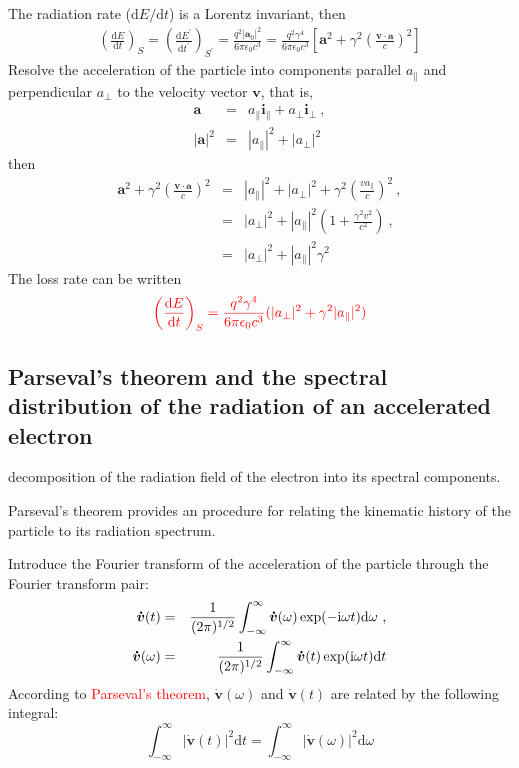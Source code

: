 \documentclass[12pt,a4paper]{article}
\renewcommand{\vec}[1]{\boldsymbol{#1}}
\newcommand{\dif}{\mathrm{d}}
\begin{document}
The radiation rate ($\dif E/\dif t$) is a Lorentz invariant, then 
\begin{eqnarray}
\left(\frac{\dif E}{\dif t}\right)_{S} = \left(\frac{\dif E^{\prime}}{\dif t^{\prime}}\right)_{S^{\prime}} = \frac{q^2 |\vec{a}_0|^2}{6\pi \epsilon_0 c^3} = \frac{q^2 \gamma^4}{6\pi \epsilon_0 c^3} \left[  \vec{a}^2 +\gamma^2 \left(\frac{\vec{v}\cdot \vec{a}}{c}\right)^2 \right]
\end{eqnarray}
Resolve the acceleration of the particle into components parallel $a_{\parallel}$ and perpendicular $a_{\perp}$ to the velocity vector $\vec{v}$, that is,
\begin{eqnarray*}
\vec{a} &=& a_{\parallel} \vec{i}_{\parallel} +a_{\perp} \vec{i}_{\perp} ~,\\
|\vec{a}|^2 &=& |a_{\parallel}|^2 +|a_{\perp}|^2
\end{eqnarray*}
then
\begin{eqnarray}
\nonumber \vec{a}^2 +\gamma^2 \left(\frac{\vec{v}\cdot \vec{a}}{c}\right)^2  &=& |a_{\parallel}|^2 +|a_{\perp}|^2 +\gamma^2\left(\frac{va_{\parallel}}{c} \right)^2 ~,\\
\nonumber &=& |a_{\perp}|^2 + |a_{\parallel}|^2 (1+\frac{\gamma^2 v^2}{c^2}) ~,\\
&=& |a_{\perp}|^2 + |a_{\parallel}|^2 \gamma^2
\end{eqnarray}
The loss rate can be written
\begin{equation}
\textcolor{red}{ \left(\frac{\dif E}{\dif t} \right)_{S} = \frac{q^2 \gamma^4}{6\pi \epsilon_0 c^3} (|a_{\perp}|^2 +\gamma^2 |a_{\parallel}|^2) }
\end{equation}

\subsection{Parseval’s theorem and the spectral distribution of the radiation of an accelerated electron}
decomposition of the radiation field of the electron into its spectral components.

Parseval’s theorem provides an procedure for relating the kinematic history of the particle to its radiation spectrum.

Introduce the Fourier transform of the acceleration of the particle through the Fourier transform pair:
\begin{eqnarray}
\vec{\dot{v}}(t) &=& \frac{1}{(2\pi)^{1/2}} \int_{-\infty}^{\infty} \vec{\dot{v}}(\omega) \exp(-{\rm i} \omega t) \dif \omega ~,\\
\vec{\dot{v}}(\omega) &=& \frac{1}{(2\pi)^{1/2}} \int_{-\infty}^{\infty} \vec{\dot{v}}(t) \exp({\rm i} \omega t) \dif t
\end{eqnarray}
According to \textcolor{red}{Parseval’s theorem}, $\vec{\dot{v}}(\omega)$ and $\vec{\dot{v}}(t)$ are related by the following integral:
\begin{equation}
\int_{-\infty}^{\infty} |\vec{\dot{v}}(t)|^2 \dif t = \int_{-\infty}^{\infty} |\vec{\dot{v}}(\omega)|^2 \dif \omega
\end{equation}
\end{document}
